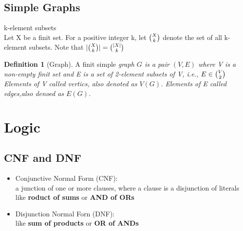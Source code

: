 \documentclass{article}
\theoremstyle{definition}
\newtheorem{definition}{Definition}[subsection]
\begin{document}
\subsection{Simple Graphs}
k-element subsets\\
Let X be a finit set. For a positive integer k, let $\tbinom{X}{k}$ denote the set of all k-element subsets. Note that $\lvert \tbinom{X}{k}\rvert = \tbinom{\lvert X\rvert}{k}$
\begin{definition}[Graph]
    A finit simple \it{graph} $G$ is a pair $(V,E)$ where V is a non-empty finit set and E is a set of 2-element subsets of V, i.e., $E \in \tbinom{V}{2}$
    Elements of V called vertics, also denoted as $V(G)$.
    Elements of E called edges,also denoed as $E(G)$.
\end{definition}

\section{Logic}
\subsection{CNF and DNF}
\begin{itemize}
    \item Conjunctive Normal Form (CNF):\\
        a junction of one or more clauses, where a clause is a disjunction of literals\\
        like \textbf{roduct of sums} or \textbf{AND of ORs}
    \item Disjunction Normal Forn (DNF):\\
        like \textbf{sum of products} or \textbf{OR of ANDs}
\end{itemize}
\end{document}
